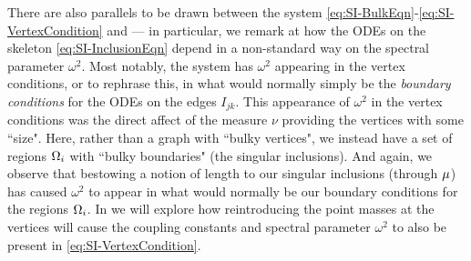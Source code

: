 There are also parallels to be drawn between the system \eqref{eq:SI-BulkEqn}-\eqref{eq:SI-VertexCondition} and  --- in particular, we remark at how the ODEs on the skeleton \eqref{eq:SI-InclusionEqn} depend in a non-standard way on the spectral parameter $\omega^2$.
Most notably, the system  has $\omega^2$ appearing in the vertex conditions, or to rephrase this, in what would normally simply be the \emph{boundary conditions} for the ODEs on the edges $I_{jk}$.
This appearance of $\omega^2$ in the vertex conditions was the direct affect of the measure $\nu$ providing the vertices with some ``size".
Here, rather than a graph with ``bulky vertices", we instead have a set of regions $\Omega_i$ with ``bulky boundaries" (the singular inclusions).
And again, we observe that bestowing a notion of length to our singular inclusions (through $\mu$) has caused $\omega^2$ to appear in what would normally be our boundary conditions for the regions $\Omega_i$.
In  we will explore how reintroducing the point masses at the vertices will cause the coupling constants and spectral parameter $\omega^2$ to also be present in \eqref{eq:SI-VertexCondition}.
